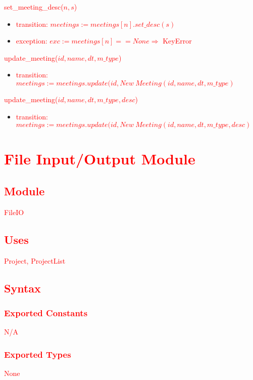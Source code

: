 \documentclass[12pt, titlepage]{article}
\begin{document}
\noindent \textcolor{red}{set\_meeting\_desc($n,s$)}
\begin{itemize}
    \item \textcolor{red}{transition: $meetings := meetings[n].set\_desc(s)$}
    \item \textcolor{red}{exception: $exc := meetings[n] == None \Rightarrow$ KeyError}
\end{itemize}

\noindent \textcolor{red}{update\_meeting($id, name, dt, m\_type$)}
\begin{itemize}
    \item \textcolor{red}{transition: $meetings := meetings.update(id, New \ Meeting(id, name, dt, m\_type)$}
\end{itemize}

\noindent \textcolor{red}{update\_meeting($id, name, dt, m\_type, desc$)}
\begin{itemize}
    \item \textcolor{red}{transition: $meetings := meetings.update(id, New \ Meeting(id, name, dt, m\_type, desc)$}
\end{itemize}

\newpage

\section* {\textcolor{red}{File Input/Output Module}}

\subsection* {\textcolor{red}{Module}}
\textcolor{red}{FileIO}

\subsection*{\textcolor{red}{Uses}}
\textcolor{red}{Project, ProjectList}

\subsection*{\textcolor{red}{Syntax}}
\subsubsection*{\textcolor{red}{Exported Constants}}
\textcolor{red}{N/A}

\subsubsection*{\textcolor{red}{Exported Types}}
\textcolor{red}{None}
\end{document}
